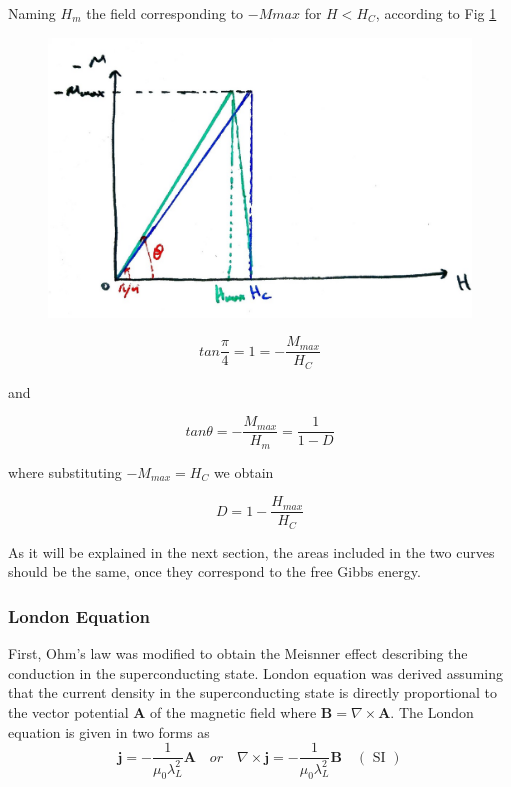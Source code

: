 \documentclass[openany,11pt,a4paper]{report}
\begin{document}
Naming $H_{m}$ the field corresponding to $-Mmax$ for $H<H_{C}$, according to 
Fig \ref{magtan}

\begin{figure}[H]
\centering
\includegraphics[scale=.5]{magtan.jpg}
\caption{\label{magtan}}
\end{figure}


\begin{equation}
tan\dfrac{\pi}{4}=1=-\dfrac{M_{max}}{H_{C}}
\end{equation}

and

\begin{equation}
tan \theta =-\dfrac{M_{max}}{H_{m}}=\dfrac{1}{1-D}
\end{equation}


where substituting $-M_{max}=H_{C}$
we obtain 



\begin{equation}
D= 1- \dfrac{H_{max}}{H_{C}}
\label{D}
\end{equation}


As it will be explained in the next section, the areas  included in the two curves should be the same, once they correspond to the free Gibbs energy.






\subsubsection{London Equation}


First, Ohm's law was modified to obtain the Meisnner effect describing the conduction in the superconducting state.  London equation was derived assuming that the current density in the superconducting state is directly proportional to the vector potential $\textbf{A}$ of the magnetic field where $\textbf{B}= \nabla \times \textbf{A}$.
The London equation is given in two forms as
\begin{equation}
 \textbf{j}=-\frac{1}{\mu_{0} \lambda_{L}^{2}} \mathbf{A}
\quad or \quad
  \nabla \times \mathbf{j}=-\frac{1}{\mu_{0} \lambda_{L}^{2}} \mathbf{B} \quad (\text { SI })
\end{equation}
\end{document}

